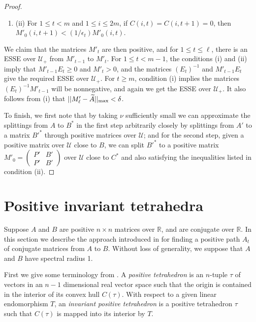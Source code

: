 \documentclass{amsart}
\theoremstyle{definition}
\theoremstyle{remark}
\numberwithin{equation}{section}
\begin{document}
{{\begin{proof}
\begin{enumerate}
\item[] (ii)
For $1\leq  t< m$ and $1\leq i \leq 2m$,  if 
$C(i,t)=C(i,t+1)=0$, then 
$M'_0(i,t+1)< (1/\epsilon_t)M'_0(i,t)$.
\end{enumerate} 
We claim that the matrices $M'_t$ are then positive, 
and for $1\leq t\leq \ell$, there is an ESSE over $\mathcal U_+$ 
from $M'_{t-1}$ to $M'_{t}$. 
For $1\leq t <m-1$, the conditions 
(i) and (ii) imply that 
$M'_{t-1}E_t\geq 0$ and 
$M'_t>0$, and the matrices 
 $(E_t)^{-1}$ and  $M'_{t-1}E_t$ give the required ESSE 
over $\mathcal U_+$.
For $t\geq m$, condition (i) 
implies the matrices 
$(E_t)^{-1}M'_{t-1}$ will be nonnegative, 
and again we get the ESSE over $\mathcal U_+$. 
It also follows from (i) that 
$||M_{\ell}'-\widetilde A||_{\textnormal{max}}<\delta$.

To finish, we 
first note  that by taking $\nu$ sufficiently small we can approximate 
the splittings from $A$ to $B^*$ in the first step
arbitrarily closely  by splittings 
from $A'$ to a matrix $B'^*$ through 
positive matrices over $\mathcal U$; and for the second 
step, 
given a positive matrix over $\mathcal U$ close to $B$, 
we can split $B'^*$  to a positive matrix 
$M'_0=
\left(
\begin{smallmatrix} P' & B'  \\ P' & B' 
\end{smallmatrix}
\right)$
over $\mathcal U$ close to $C^*$ and also satisfying the 
inequalities listed in condition (ii). 
\end{proof}

\section{Positive invariant tetrahedra}\label{tetrahedrasec}


Suppose $A$ and $B$ are positive  $n\times n$ matrices over 
$\mathbb R$, and are conjugate over $\mathbb R$.  
In this section we describe the 
approach introduced in \cite{KR2} 
for finding a positive path $A_t$  of conjugate matrices 
from $A$ to $B$. 
Without loss of generality, we suppose that $A$ and $B$ 
have spectral radius 1.  

First we give some terminology from \cite{KR2}. 
A {\it positive tetrahedron} is 
an $n$-tuple $\tau$ of vectors 
in an $n-1$ dimensional 
real vector space
such that the origin 
is contained in the interior of 
its  convex hull $C(\tau )$. With respect to a given 
linear endomorphism $T$, an 
{\it invariant positive tetrahedron} is a positive 
tetrahedron $\tau$ such that $C(\tau )$ is mapped into 
its interior by $T$. 

}}
\end{document}
